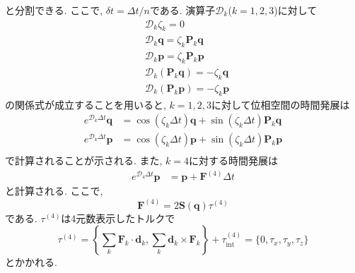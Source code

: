 と分割できる. ここで, $\delta t = \Delta t / n$である. 
演算子$\mathcal{D}_{k}$($k=1,2,3$)に対して
\begin{align}
 &\mathcal{D}_{k} \zeta_{k} = 0
 \\
 &\mathcal{D}_{k} \bm{q} = \zeta_{k} \bm{P}_{k} \bm{q}
 \\
 &\mathcal{D}_{k} \bm{p} = \zeta_{k} \bm{P}_{k} \bm{p}
 \\
 &\mathcal{D}_{k} (\bm{P}_{k} \bm{q}) = - \zeta_{k} \bm{q}
 \\
 &\mathcal{D}_{k} (\bm{P}_{k} \bm{p}) = - \zeta_{k} \bm{p}
\end{align}
の関係式が成立することを用いると, $k=1,2,3$に対して位相空間の時間発展は
\begin{align}
 e^{\mathcal{D}_{k} \Delta t} \bm{q}
 &=
 \cos(\zeta_{k} \Delta t) \bm{q} + \sin(\zeta_{k} \Delta t) \bm{P}_{k} \bm{q}
 \\
 e^{\mathcal{D}_{k} \Delta t} \bm{p}
 &=
 \cos(\zeta_{k} \Delta t) \bm{p} + \sin(\zeta_{k} \Delta t) \bm{P}_{k} \bm{p} \\
\end{align}
で計算されることが示される. また, $k=4$に対する時間発展は
\begin{align}
 e^{\mathcal{D}_{4} \Delta t} \bm{p}
 &=
 \bm{p} + \bm{F}^{(4)} \Delta t 
\end{align}
と計算される. ここで, 
\begin{equation}
 \bm{F}^{(4)} = 2 \bm{S}(\bm{q}) \tau^{(4)}
\end{equation}
である. $\tau^{(4)}$は4元数表示したトルクで
\begin{equation}
 \tau^{(4)}
  = \left\{\sum_{k} \bm{F}_{k} \cdot \bm{d}_{k},
           \sum_{k} \bm{d}_{k} \times \bm{F}_{k} \right\}
  + \tau_{\mathrm{int}}^{(4)}
  = \{0, \tau_{x}, \tau_{y}, \tau_{z} \}
\end{equation}
とかかれる. 
\clearpage


